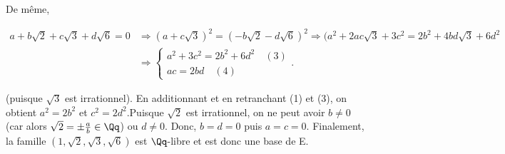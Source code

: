 {\begin{enumerate}
{De même,

\begin{align*}
a+b\sqrt{2}+c\sqrt{3}+d\sqrt{6}=0&\Rightarrow(a+c\sqrt{3})^2=(-b\sqrt{2}-d\sqrt{6})^2
\Rightarrow(a^2+2ac\sqrt{3}+3c^2=2b^2+4bd\sqrt{3}+6d^2\\
 &\Rightarrow\left\{
\begin{array}{l}
a^2+3c^2=2b^2+6d^2\quad(3)\\
ac=2bd\quad(4)
\end{array}
\right..
\end{align*}

(puisque $\sqrt{3}$ est irrationnel). En additionnant et en retranchant (1) et (3), on obtient $a^2=2b^2$ et
$c^2=2d^2$.Puisque $\sqrt{2}$ est irrationnel, on ne peut avoir $b\neq0$ (car alors $\sqrt{2}=\pm\frac{a}{b}\in\Qq$) 
ou $d\neq0$. Donc, $b=d=0$ puis  $a=c=0$. Finalement, la famille $(1,\sqrt{2},\sqrt{3},\sqrt{6})$ est $\Qq$-libre et
est donc une base de E.}
\end{enumerate}
}
